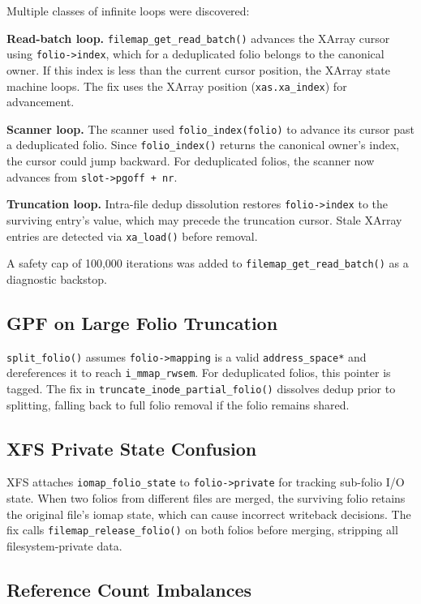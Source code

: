 \documentclass[conference]{IEEEtran}
\begin{document}
Multiple classes of infinite loops were discovered:

\textbf{Read-batch loop.} \texttt{filemap\_get\_read\_batch()} advances the XArray cursor using \texttt{folio->index}, which for a deduplicated folio belongs to the canonical owner. If this index is less than the current cursor position, the XArray state machine loops. The fix uses the XArray position (\texttt{xas.xa\_index}) for advancement.

\textbf{Scanner loop.} The scanner used \texttt{folio\_index(folio)} to advance its cursor past a deduplicated folio. Since \texttt{folio\_index()} returns the canonical owner's index, the cursor could jump backward. For deduplicated folios, the scanner now advances from \texttt{slot->pgoff + nr}.

\textbf{Truncation loop.} Intra-file dedup dissolution restores \texttt{folio->index} to the surviving entry's value, which may precede the truncation cursor. Stale XArray entries are detected via \texttt{xa\_load()} before removal.

A safety cap of 100{,}000 iterations was added to \texttt{filemap\_get\_read\_batch()} as a diagnostic backstop.

\subsection{GPF on Large Folio Truncation}

\texttt{split\_folio()} assumes \texttt{folio->mapping} is a valid \texttt{address\_space*} and dereferences it to reach \texttt{i\_mmap\_rwsem}. For deduplicated folios, this pointer is tagged. The fix in \texttt{truncate\_inode\_partial\_folio()} dissolves dedup prior to splitting, falling back to full folio removal if the folio remains shared.

\subsection{XFS Private State Confusion}

XFS attaches \texttt{iomap\_folio\_state} to \texttt{folio->private} for tracking sub-folio I/O state. When two folios from different files are merged, the surviving folio retains the original file's iomap state, which can cause incorrect writeback decisions. The fix calls \texttt{filemap\_release\_folio()} on both folios before merging, stripping all filesystem-private data.

\subsection{Reference Count Imbalances}
\end{document}
